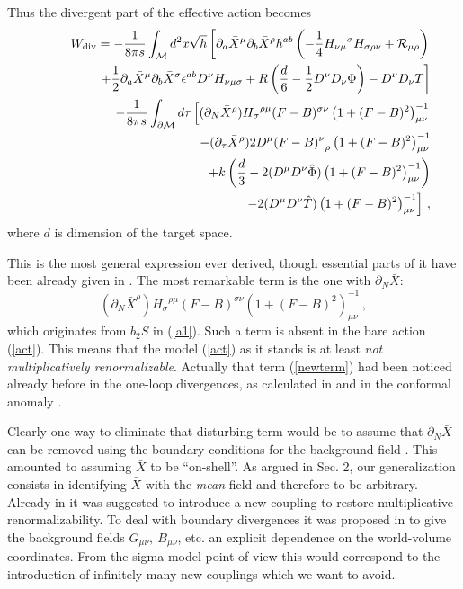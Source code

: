 \documentclass[a4paper,12pt]{article}
\begin{document}
Thus the divergent part of the effective action becomes 
\begin{eqnarray}
&&W_{{\mbox {\scriptsize {div}}}}=-\frac 1{8\pi s}
\int_{\cal M} d^2x \sqrt{h} \left[ 
\partial_a \bar X^\mu \partial_b \bar X^\rho h^{ab}
\left( -\frac 14 {H_{\nu\mu}}^\sigma H_{\sigma\rho\nu}
+{\cal R}_{\mu\rho} \right) \right. \nonumber \\
&&\qquad\qquad \left. +\frac 12 
\partial_a \bar X^\mu \partial_b \bar X^\sigma \epsilon^{ab}
D^\nu H_{\nu\mu\sigma} +R\left( \frac d6 -\frac 12
D^\nu D_\nu \Phi \right) -D^\nu D_\nu T \right] \nonumber \\
&&\qquad\quad\ -\frac 1{8\pi s}
\int_{\partial {\cal M}} d\tau \left[ (\partial_N \bar X^\rho )
{H_\sigma}^{\rho\mu} (F-B)^{\sigma\nu} 
\left( 1+(F-B)^2 \right)^{-1}_{\mu\nu} \right. \nonumber \\
&&\qquad\qquad -(\partial_\tau \bar X^\rho )
2D^\mu {(F-B)^\nu}_\rho 
\left( 1+(F-B)^2 \right)^{-1}_{\mu\nu} \nonumber \\
&&\qquad\qquad +k\left( \frac d3 -2 (D^\mu D^\nu \hat \Phi )
\left( 1+(F-B)^2 \right)^{-1}_{\mu\nu} \right) \nonumber \\
&&\qquad\qquad \left. -2 (D^\mu D^\nu \hat T )
\left( 1+(F-B)^2 \right)^{-1}_{\mu\nu} \right] \,,
\label{Wdivold}
\end{eqnarray}
where $d$ is dimension of the target space.

This is the most general expression ever derived, though 
 essential parts of it have been
already given in \cite{dornotto86,Callan88,Osborn91}.
The most remarkable term is the one with  $\partial_N \bar X$:
\begin{equation}
(\partial_N \bar X^\rho )
{H_\sigma}^{\rho\mu} (F-B)^{\sigma\nu} 
\left( 1+(F-B)^2 \right)^{-1}_{\mu\nu} \,, \label{newterm}
\end{equation}
which originates from $b_2S$ in (\ref{a1}).
Such a term is  absent in the bare action (\ref{act}).
This means that the model (\ref{act}) as it stands is at 
least {\it not multiplicatively  renormalizable}. Actually 
that term (\ref{newterm}) had been noticed already before in the one-loop
divergences, as calculated  in \cite{dornotto86,Callan88} and in the
conformal anomaly \cite{Osborn91}.

Clearly one way to eliminate that disturbing term would be 
to assume that $\partial_N \bar X$ can be removed using the 
boundary conditions for the background field \cite{Callan88}. 
This amounted to assuming $\bar X$ to be ``on-shell''.
As argued in Sec. 2, our generalization consists in identifying
$\bar X$ with the {\it mean} field and 
therefore to be arbitrary. Already in \cite{dornotto86} it was suggested 
to introduce a 
new coupling to restore multiplicative renormalizability. 
To deal with boundary divergences it was proposed in \cite{behrndtdorn92}
to give the background fields $G_{\mu\nu},\ B_{\mu\nu}$, etc.
an explicit dependence on the world-volume coordinates.
{}From the sigma model point of view this would correspond to
the introduction of infinitely many new couplings which we
want to avoid.
\end{document}
